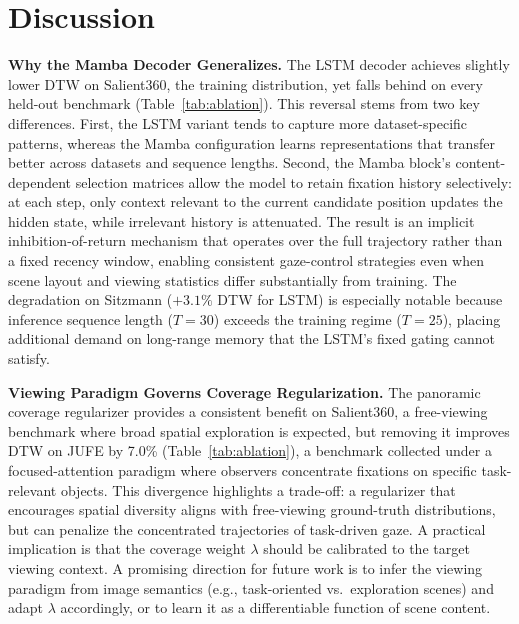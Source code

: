 \documentclass[sigconf]{acmart}
\begin{document}
\section{Discussion}
\label{sec:discussion}

\textbf{Why the Mamba Decoder Generalizes.}
The LSTM decoder achieves slightly lower DTW on Salient360, the training
distribution, yet falls behind on every held-out benchmark
(Table~\ref{tab:ablation}).
This reversal stems from two key differences.
First, the LSTM variant tends to capture more dataset-specific
patterns, whereas the Mamba configuration learns representations that
transfer better across datasets and sequence lengths.
Second, the Mamba block's content-dependent selection matrices allow the model to
retain fixation history selectively: at each step, only context relevant to
the current candidate position updates the hidden state, while irrelevant
history is attenuated.
The result is an implicit inhibition-of-return mechanism that operates
over the full trajectory rather than a fixed recency window, enabling
consistent gaze-control strategies even when scene layout and viewing
statistics differ substantially from training.
The degradation on Sitzmann ($+3.1\%$ DTW for LSTM) is especially notable
because inference sequence length ($T{=}30$) exceeds the training regime
($T{=}25$), placing additional demand on long-range memory that the LSTM's
fixed gating cannot satisfy.

\textbf{Viewing Paradigm Governs Coverage Regularization.}
The panoramic coverage regularizer provides a consistent benefit on
Salient360, a free-viewing benchmark where broad spatial exploration is
expected, but removing it improves DTW on JUFE by 7.0\%
(Table~\ref{tab:ablation}), a benchmark collected under a focused-attention
paradigm where observers concentrate fixations on specific task-relevant objects.
This divergence highlights a trade-off: a regularizer that encourages
spatial diversity aligns with free-viewing ground-truth distributions, but
can penalize the concentrated trajectories of task-driven gaze.
A practical implication is that the coverage weight $\lambda$ should be
calibrated to the target viewing context.
A promising direction for future work is to infer the viewing paradigm from
image semantics (e.g., task-oriented vs.\ exploration scenes) and adapt
$\lambda$ accordingly, or to learn it as a differentiable function of
scene content.
\end{document}
